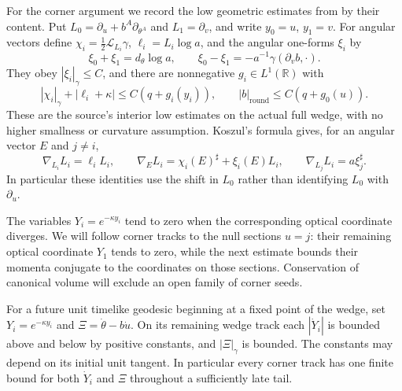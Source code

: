 For the corner argument we record the low geometric estimates from
\cite[ and ]{Foundation} by their
content. Put $L_0=\partial_u+b^A\partial_{\theta^A}$ and
$L_1=\partial_v$, and write $y_0=u$, $y_1=v$. For angular vectors
define $\chi_i=\tfrac12\mathcal L_{L_i}\gamma$,
$\ell_i=L_i\log a$, and the angular one-forms $\xi_i$ by
\begin{equation}\label{test:torsion-def}
 \xi_0+\xi_1=d_\theta\log a,
 \qquad
 \xi_0-\xi_1=-a^{-1}\gamma(\partial_vb,\cdot).
\end{equation}
They obey $|\xi_i|_\gamma\le C$, and there are nonnegative
$g_i\in L^1(\mathbb R)$ with
\begin{equation}\label{test:corner-low}
 |\chi_i|_\gamma+|\ell_i+\kappa|
       \le C(q+g_i(y_i)),
 \qquad |b|_{\mathrm{round}}\le C(q+g_0(u)).
\end{equation}
These are the source's interior low estimates on the actual full
wedge, with no higher smallness or curvature assumption. Koszul's
formula gives, for an angular vector $E$ and $j\ne i$,
\begin{equation}\label{test:null-connections}
 \nabla_{L_i}L_i=\ell_iL_i,
 \qquad
 \nabla_E L_i=\chi_i(E)^\sharp+\xi_i(E)L_i,
 \qquad
 \nabla_{L_j}L_i=a\xi_j^\sharp.
\end{equation}
In particular these identities use the shift in $L_0$ rather than
identifying $L_0$ with $\partial_u$.

The variables $Y_i=e^{-\kappa y_i}$ tend to zero when the corresponding
optical coordinate diverges. We will follow corner tracks to the null
sections $u=j$: their remaining optical coordinate $Y_1$ tends to
zero, while the next estimate bounds their momenta conjugate to the
coordinates on those sections. Conservation of canonical volume will exclude an open
family of corner seeds.

\begin{lemma}
\label{test:corner-bounds}
For a future unit timelike geodesic beginning at a fixed point of the
wedge, set $Y_i=e^{-\kappa y_i}$ and
$\Xi=\dot\theta-b\dot u$. On its remaining wedge track each
$|\dot Y_i|$ is bounded above and below by positive constants,
and $|\Xi|_\gamma$ is bounded. The constants may depend on its
initial unit tangent. In particular every corner track has one finite
bound for both $\dot Y_i$ and $\Xi$ throughout a sufficiently
late tail.
\end{lemma}

